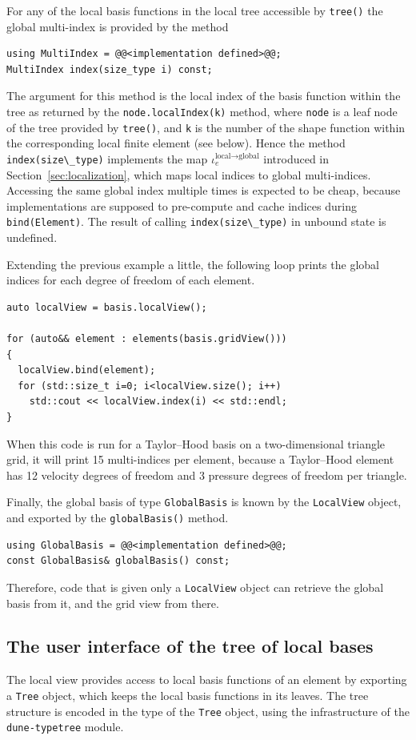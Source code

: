 \documentclass[a4paper,10pt,headings=normal,bibliography=totoc]{scrartcl}
\newcommand{\cpp}[1]{\lstinline[basicstyle=\ttfamily]!#1!}
\newcommand{\dunemodule}[1]{\texttt{#1}}
\begin{document}
For any of the local basis functions in the local tree
accessible by \cpp{tree()} the global multi-index
is provided by the method
\begin{lstlisting}[style=Interface]
using MultiIndex = @@<implementation defined>@@;
MultiIndex index(size_type i) const;
\end{lstlisting}
The argument for this method is the local
index of the basis function within the tree as
returned by the \cpp{node.localIndex(k)}
method, where \cpp{node} is a leaf node of the
tree provided by \cpp{tree()}, and \cpp{k}
is the number of the shape function within the corresponding
local finite element (see below).
Hence the method \cpp{index(size\_type)}
implements the map $\iota^{\text{local}\to\text{global}}_e$
introduced in Section~\ref{sec:localization},
which maps local indices to global multi-indices.
Accessing the same global index multiple times
is expected to be cheap, because implementations are supposed to pre-compute
and cache indices during \cpp{bind(Element)}.
The result of calling \cpp{index(size\_type)} in
unbound state is undefined.

Extending the previous example a little, the following loop prints the
global indices for each degree of freedom of each element.
\begin{lstlisting}[style=example]
auto localView = basis.localView();

for (auto&& element : elements(basis.gridView()))
{
  localView.bind(element);
  for (std::size_t i=0; i<localView.size(); i++)
    std::cout << localView.index(i) << std::endl;
}
\end{lstlisting}
When this code is run for a Taylor--Hood basis on a two-dimensional triangle grid,
it will print 15 multi-indices per element, because a Taylor--Hood element has 12
velocity degrees of freedom and 3 pressure degrees of freedom per triangle.

Finally, the global basis of type \cpp{GlobalBasis}
is known by the \cpp{LocalView} object, and exported by the \cpp{globalBasis()} method.
\begin{lstlisting}[style=Interface]
using GlobalBasis = @@<implementation defined>@@;
const GlobalBasis& globalBasis() const;
\end{lstlisting}
%
Therefore, code that is given only a \cpp{LocalView} object can retrieve the
global basis from it, and the grid view from there.


\subsection{The user interface of the tree of local bases}
The local view provides access to local basis functions of an element
by exporting a \cpp{Tree} object, which keeps the local basis functions in its leaves.
The tree structure is encoded in the type of the \cpp{Tree} object,
using the infrastructure of the \dunemodule{dune-typetree} module.
\end{document}
